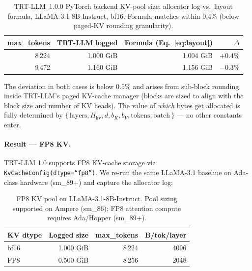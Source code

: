 \documentclass{article}
\begin{document}
\begin{table}[h]
\centering
\small
\setlength{\tabcolsep}{8pt}
\renewcommand{\arraystretch}{1.15}
\caption{TRT-LLM~1.0.0 PyTorch backend KV-pool size: allocator log vs.\ layout formula, LLaMA-3.1-8B-Instruct, bf16. Formula matches within $0.4\%$ (below paged-KV rounding granularity).}
\label{tab:trtllm-validation}
\begin{tabular}{@{}r r r r@{}}
\toprule
\textbf{max\_tokens} & \textbf{TRT-LLM logged} & \textbf{Formula (Eq.~\ref{eq:layout})} & \textbf{$\Delta$} \\
\midrule
 8\,224 & 1.000 GiB & 1.004 GiB & $+0.4\%$ \\
 9\,472 & 1.160 GiB & 1.156 GiB & $-0.3\%$ \\
\bottomrule
\end{tabular}
\end{table}
 
The deviation in both cases is below $0.5\%$ and arises from
sub-block rounding inside TRT-LLM's paged KV-cache manager
(blocks are sized to align with the block size and number of KV heads).
The value of \emph{which} bytes get allocated is fully determined by
$\{\,\text{layers}, H_{\mathrm{kv}}, d, b_K, b_V, \text{tokens}, \text{batch}\,\}$ ---
no other constants enter.
 
\paragraph{Result --- FP8 KV.} TRT-LLM 1.0 supports FP8 KV-cache
storage via \texttt{KvCacheConfig(dtype=``fp8'')}. We re-run the same
LLaMA-3.1 baseline on Ada-class hardware (sm\_89+) and capture the
allocator log:
 
\begin{table}[h]
\centering
\small
\setlength{\tabcolsep}{8pt}
\renewcommand{\arraystretch}{1.15}
\caption{FP8 KV pool on LLaMA-3.1-8B-Instruct. Pool sizing supported on Ampere (sm\_86); FP8 attention compute requires Ada/Hopper (sm\_89+).}
\label{tab:trtllm-fp8-validation}
\begin{tabular}{@{}l r r r@{}}
\toprule
\textbf{KV dtype} & \textbf{Logged size} & \textbf{max\_tokens} & \textbf{B/tok/layer} \\
\midrule
bf16 & 1.000 GiB & 8\,224 & 4096 \\
FP8  & 0.500 GiB & 8\,256 & 2048 \\
\bottomrule
\end{tabular}
\end{table}
 
\end{document}
